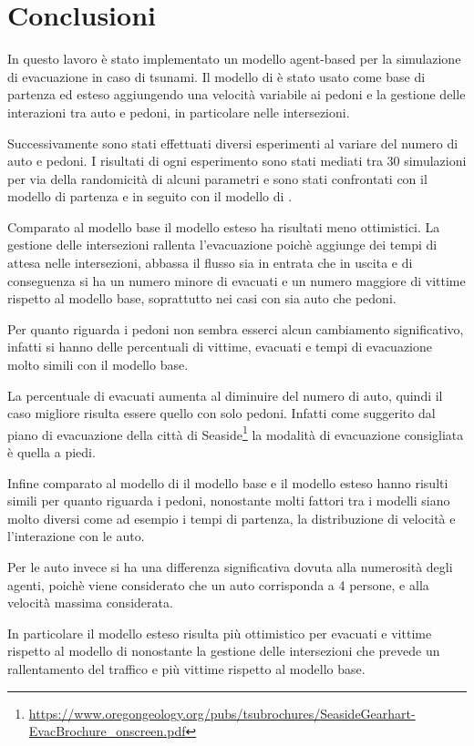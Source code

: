 \section{Conclusioni}
\label{sec:conclusione}
In questo lavoro è stato implementato un modello agent-based per la simulazione di evacuazione in caso di tsunami.
Il modello di \textcite{wang2016agent} è stato usato come base di partenza ed esteso aggiungendo una velocità
variabile ai pedoni e la gestione delle interazioni tra auto e pedoni, in particolare nelle intersezioni.

Successivamente sono stati effettuati diversi esperimenti al variare del numero di auto e pedoni.
I risultati di ogni esperimento sono stati mediati tra 30 simulazioni per via della randomicità di alcuni parametri
e sono stati confrontati con il modello di partenza e in seguito con il modello di \textcite{wang2021novel}.

Comparato al modello base il modello esteso ha risultati meno ottimistici.
La gestione delle intersezioni rallenta l'evacuazione poichè aggiunge dei tempi di attesa nelle intersezioni,
abbassa il flusso sia in entrata che in uscita e di conseguenza si ha un numero minore di evacuati e
un numero maggiore di vittime rispetto al modello base, soprattutto nei casi con sia auto che pedoni.

Per quanto riguarda i pedoni non sembra esserci alcun cambiamento significativo,
infatti si hanno delle percentuali di vittime, evacuati e tempi di evacuazione molto simili con il modello base.

La percentuale di evacuati aumenta al diminuire del numero di auto, quindi il caso migliore risulta essere quello con solo pedoni.
Infatti come suggerito dal piano di evacuazione della città di Seaside\footnote{\url{https://www.oregongeology.org/pubs/tsubrochures/SeasideGearhart-EvacBrochure_onscreen.pdf}}
la modalità di evacuazione consigliata è quella a piedi.

Infine comparato al modello di \textcite{wang2021novel} il modello base e il modello esteso hanno risulti simili per quanto riguarda i pedoni, nonostante
molti fattori tra i modelli siano molto diversi come ad esempio i tempi di partenza, la distribuzione di velocità e l'interazione con le auto.

Per le auto invece si ha una differenza significativa dovuta alla numerosità degli agenti, poichè viene considerato che un auto corrisponda a 4 persone, e alla 
velocità massima considerata. 

In particolare il modello esteso risulta più ottimistico per evacuati e vittime rispetto al modello di \textcite{wang2021novel} nonostante la gestione delle intersezioni
che prevede un rallentamento del traffico e più vittime rispetto al modello base.

